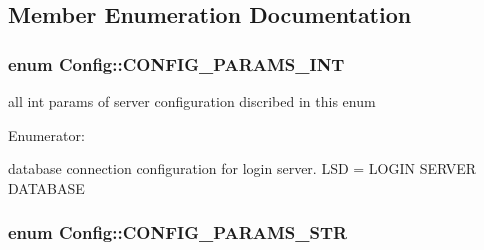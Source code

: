\subsection{\-Member \-Enumeration \-Documentation}
\hypertarget{classConfig_a0f80a094ada73f8574e85b160a5e47b7}{
\subsubsection[{\-C\-O\-N\-F\-I\-G\-\_\-\-P\-A\-R\-A\-M\-S\-\_\-\-I\-N\-T}]{\setlength{\rightskip}{0pt plus 5cm}enum {\bf \-Config\-::\-C\-O\-N\-F\-I\-G\-\_\-\-P\-A\-R\-A\-M\-S\-\_\-\-I\-N\-T}}}\label{classConfig_a0f80a094ada73f8574e85b160a5e47b7}


all int params of server configuration discribed in this enum 

\begin{Desc}
\item[\-Enumerator\-: ]\par
\begin{description}
\item[{\em 
\hypertarget{classConfig_a0f80a094ada73f8574e85b160a5e47b7adcfee10d7cec219fc657459ee83d642f}{\-S\-S\-D\-\_\-\-P\-O\-R\-T}\label{classConfig_a0f80a094ada73f8574e85b160a5e47b7adcfee10d7cec219fc657459ee83d642f}
}]database connection configuration for login server. \-L\-S\-D = \-L\-O\-G\-I\-N \-S\-E\-R\-V\-E\-R \-D\-A\-T\-A\-B\-A\-S\-E \end{description}
\end{Desc}

\hypertarget{classConfig_a6d78e4d65fd44d149ad6facce11bc11e}{
\subsubsection[{\-C\-O\-N\-F\-I\-G\-\_\-\-P\-A\-R\-A\-M\-S\-\_\-\-S\-T\-R}]{\setlength{\rightskip}{0pt plus 5cm}enum {\bf \-Config\-::\-C\-O\-N\-F\-I\-G\-\_\-\-P\-A\-R\-A\-M\-S\-\_\-\-S\-T\-R}}}\label{classConfig_a6d78e4d65fd44d149ad6facce11bc11e}


